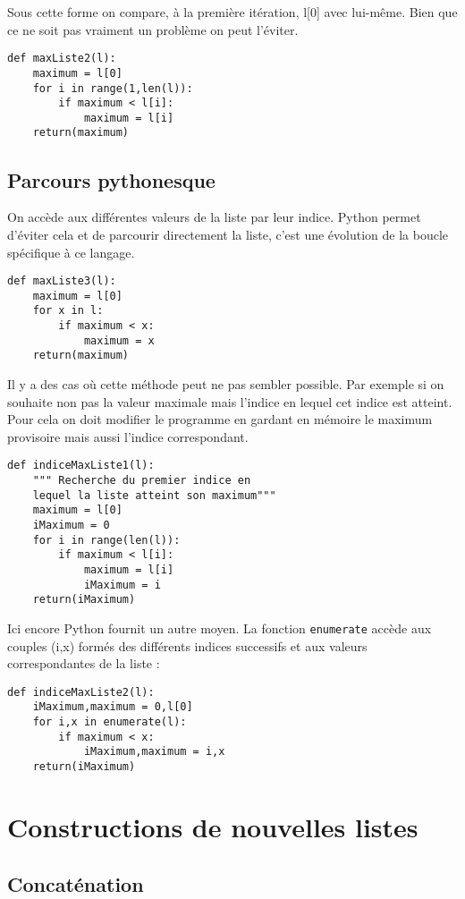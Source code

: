 \break

Sous cette forme on compare, à la première itération, l[0] avec lui-même. Bien que ce ne soit pas vraiment un problème on peut l’éviter.
\begin{lstlisting}
def maxListe2(l):
	maximum = l[0]
	for i in range(1,len(l)):
		if maximum < l[i]:
			maximum = l[i]
	return(maximum)
\end{lstlisting}


\subsection{Parcours pythonesque}
On accède aux différentes valeurs de la liste par leur indice. Python permet d’éviter cela et de parcourir directement la liste, c’est une évolution de la boucle spécifique à ce langage.

\begin{lstlisting}
def maxListe3(l):
	maximum = l[0]
	for x in l:
		if maximum < x:
			maximum = x
	return(maximum)
\end{lstlisting}


Il y a des cas où cette méthode peut ne pas sembler possible.
Par exemple si on souhaite non pas la valeur maximale mais l’indice en lequel cet indice est atteint.
Pour cela on doit modifier le programme en gardant en mémoire le maximum provisoire mais aussi l’indice correspondant.
\begin{lstlisting}
def indiceMaxListe1(l):
	""" Recherche du premier indice en
	lequel la liste atteint son maximum"""	
	maximum = l[0]
	iMaximum = 0
	for i in range(len(l)):
		if maximum < l[i]:
			maximum = l[i]
			iMaximum = i
	return(iMaximum)
\end{lstlisting}

\break

Ici encore Python fournit un autre moyen.
La fonction {\tt enumerate} accède aux couples (i,x) formés des différents indices successifs et aux valeurs correspondantes de la liste :
\begin{lstlisting}
def indiceMaxListe2(l):
	iMaximum,maximum = 0,l[0]
	for i,x in enumerate(l):
		if maximum < x:
			iMaximum,maximum = i,x
	return(iMaximum)
\end{lstlisting}


\section{Constructions de nouvelles listes}


\subsection{Concaténation}

